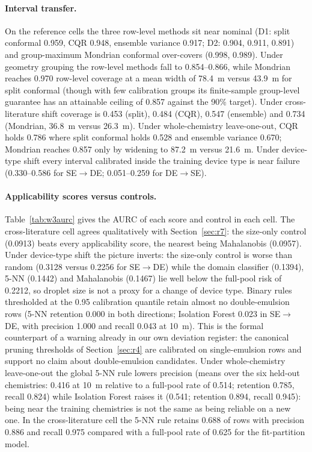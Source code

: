 \documentclass[11pt,a4paper]{article}
\newcommand{\um}{\textmu m}
\begin{document}
\paragraph{Interval transfer.} On the reference cells the three row-level
methods sit near nominal (D1: split conformal 0.959, CQR 0.948, ensemble
variance 0.917; D2: 0.904, 0.911, 0.891) and group-maximum Mondrian
conformal over-covers (0.998, 0.989). Under geometry grouping the row-level
methods fall to 0.854--0.866, while Mondrian reaches 0.970 row-level coverage at a mean width of 78.4~\um{} versus 43.9~\um{} for split conformal (though with few calibration groups its finite-sample group-level guarantee has an attainable ceiling of 0.857 against the 90\% target). Under cross-literature
shift coverage is 0.453 (split), 0.484 (CQR), 0.547 (ensemble) and 0.734
(Mondrian, 36.8~\um{} versus 26.3~\um). Under whole-chemistry leave-one-out,
CQR holds 0.786 where split conformal holds 0.528 and ensemble variance
0.670; Mondrian reaches 0.857 only by widening to 87.2~\um{} versus 21.6~\um. Under device-type shift every interval calibrated inside the
training device type is near failure (0.330--0.586 for SE$\to$DE;
0.051--0.259 for DE$\to$SE).

\paragraph{Applicability scores versus controls.} Table~\ref{tab:w3aurc}
gives the AURC of each score and control in each cell. The cross-literature
cell agrees qualitatively with Section~\ref{sec:r7}: the size-only control (0.0913) beats
every applicability score, the nearest being Mahalanobis (0.0957). Under
device-type shift the picture inverts: the size-only control is worse than
random (0.3128 versus 0.2256 for SE$\to$DE) while the domain classifier
(0.1394), 5-NN (0.1442) and Mahalanobis (0.1467) lie well below the
full-pool risk of 0.2212, so droplet size is not a proxy for a change of
device type. Binary rules thresholded at the 0.95 calibration quantile retain
almost no double-emulsion rows (5-NN retention 0.000 in both directions;
Isolation Forest 0.023 in SE$\to$DE, with precision 1.000 and recall 0.043
at 10~\um). This is the formal counterpart of a warning already in our own
deviation register: the canonical pruning thresholds of Section~\ref{sec:r4}
are calibrated on single-emulsion rows and support no claim about
double-emulsion candidates. Under whole-chemistry leave-one-out the global 5-NN
rule lowers precision (means over the six held-out chemistries: 0.416 at 10~\um{}
relative to a full-pool rate of 0.514;
retention 0.785, recall 0.824) while Isolation Forest raises it (0.541;
retention 0.894, recall 0.945): being near the training chemistries is not
the same as being reliable on a new one. In the cross-literature cell the
5-NN rule retains 0.688 of rows with precision 0.886 and recall 0.975
compared with a full-pool rate of 0.625 for the fit-partition model.
\end{document}

